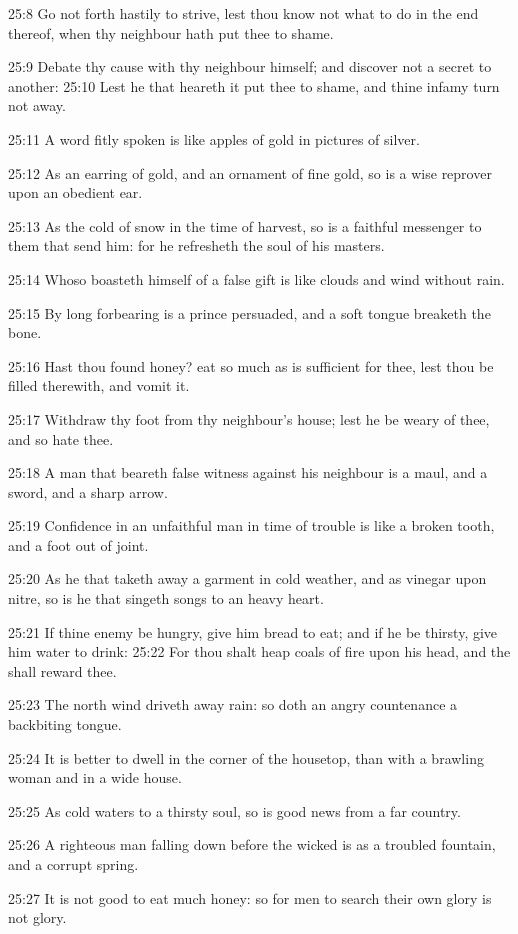 25:8 Go not forth hastily to strive, lest thou know not what to do in
the end thereof, when thy neighbour hath put thee to shame.

25:9 Debate thy cause with thy neighbour himself; and discover not a
secret to another: 25:10 Lest he that heareth it put thee to shame,
and thine infamy turn not away.

25:11 A word fitly spoken is like apples of gold in pictures of
silver.

25:12 As an earring of gold, and an ornament of fine gold, so is a
wise reprover upon an obedient ear.

25:13 As the cold of snow in the time of harvest, so is a faithful
messenger to them that send him: for he refresheth the soul of his
masters.

25:14 Whoso boasteth himself of a false gift is like clouds and wind
without rain.

25:15 By long forbearing is a prince persuaded, and a soft tongue
breaketh the bone.

25:16 Hast thou found honey? eat so much as is sufficient for thee,
lest thou be filled therewith, and vomit it.

25:17 Withdraw thy foot from thy neighbour's house; lest he be weary
of thee, and so hate thee.

25:18 A man that beareth false witness against his neighbour is a
maul, and a sword, and a sharp arrow.

25:19 Confidence in an unfaithful man in time of trouble is like a
broken tooth, and a foot out of joint.

25:20 As he that taketh away a garment in cold weather, and as vinegar
upon nitre, so is he that singeth songs to an heavy heart.

25:21 If thine enemy be hungry, give him bread to eat; and if he be
thirsty, give him water to drink: 25:22 For thou shalt heap coals of
fire upon his head, and the \LORD shall reward thee.

25:23 The north wind driveth away rain: so doth an angry countenance a
backbiting tongue.

25:24 It is better to dwell in the corner of the housetop, than with a
brawling woman and in a wide house.

25:25 As cold waters to a thirsty soul, so is good news from a far
country.

25:26 A righteous man falling down before the wicked is as a troubled
fountain, and a corrupt spring.

25:27 It is not good to eat much honey: so for men to search their own
glory is not glory.

